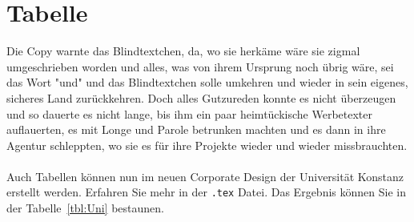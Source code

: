 
%
%
%
%
%
%
%
%
%
%
%
%
%
%
%
%
%

\section{Tabelle}

Die Copy warnte das Blindtextchen, da, wo sie herkäme wäre sie zigmal umgeschrieben worden und alles, was von ihrem Ursprung noch übrig wäre, sei das Wort "und" und das Blindtextchen solle umkehren und wieder in sein eigenes, sicheres Land zurückkehren. Doch alles Gutzureden konnte es nicht überzeugen und so dauerte es nicht lange, bis ihm ein paar heimtückische Werbetexter auflauerten, es mit Longe und Parole betrunken machten und es dann in ihre Agentur schleppten, wo sie es für ihre Projekte wieder und wieder missbrauchten.\\
\\
Auch Tabellen können nun im neuen Corporate Design der Universität Konstanz erstellt werden. Erfahren Sie mehr in der \texttt{.tex} Datei. Das Ergebnis können Sie in der Tabelle~\ref{tbl:Uni} bestaunen.

